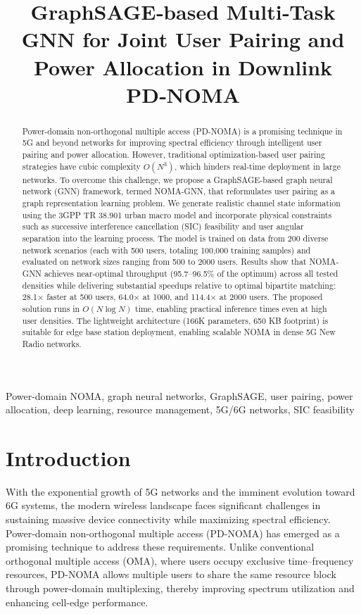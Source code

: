 \documentclass[conference]{IEEEtran}
\title{GraphSAGE‑based Multi‑Task GNN for Joint User Pairing and Power Allocation in Downlink PD‑NOMA}
\begin{document}
\maketitle

\begin{abstract}
Power-domain non-orthogonal multiple access (PD-NOMA) is a promising technique in 5G and beyond networks for improving spectral efficiency through intelligent user pairing and power allocation. However, traditional optimization-based user pairing strategies have cubic complexity $O(N^3)$, which hinders real-time deployment in large networks. To overcome this challenge, we propose a GraphSAGE-based graph neural network (GNN) framework, termed NOMA-GNN, that reformulates user pairing as a graph representation learning problem. We generate realistic channel state information using the 3GPP TR 38.901 urban macro model and incorporate physical constraints such as successive interference cancellation (SIC) feasibility and user angular separation into the learning process. The model is trained on data from 200 diverse network scenarios (each with 500 users, totaling 100,000 training samples) and evaluated on network sizes ranging from 500 to 2000 users. Results show that NOMA-GNN achieves near-optimal throughput (95.7–96.5\% of the optimum) across all tested densities while delivering substantial speedups relative to optimal bipartite matching: 28.1× faster at 500 users, 64.0× at 1000, and 114.4× at 2000 users. The proposed solution runs in $O(N \log N)$ time, enabling practical inference times even at high user densities. The lightweight architecture (166K parameters, 650 KB footprint) is suitable for edge base station deployment, enabling scalable NOMA in dense 5G New Radio networks.
\end{abstract}

\begin{IEEEkeywords}
Power-domain NOMA, graph neural networks, GraphSAGE, user pairing, power allocation, deep learning, resource management, 5G/6G networks, SIC feasibility
\end{IEEEkeywords}

\section{Introduction}

With the exponential growth of 5G networks and the imminent evolution toward 6G systems, the modern wireless landscape faces significant challenges in sustaining massive device connectivity while maximizing spectral efficiency. Power-domain non-orthogonal multiple access (PD-NOMA) has emerged as a promising technique to address these requirements. Unlike conventional orthogonal multiple access (OMA), where users occupy exclusive time–frequency resources, PD-NOMA allows multiple users to share the same resource block through power-domain multiplexing, thereby improving spectrum utilization and enhancing cell-edge performance.
\end{document}
